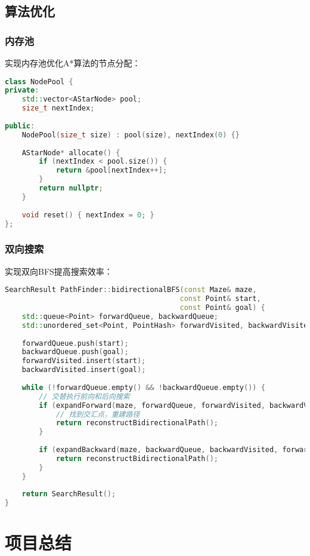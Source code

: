 \documentclass[UTF8]{ctexart}
\begin{document}
\subsection{算法优化}

\subsubsection{内存池}
实现内存池优化A*算法的节点分配：
\begin{lstlisting}[language=C++]
class NodePool {
private:
    std::vector<AStarNode> pool;
    size_t nextIndex;
    
public:
    NodePool(size_t size) : pool(size), nextIndex(0) {}
    
    AStarNode* allocate() {
        if (nextIndex < pool.size()) {
            return &pool[nextIndex++];
        }
        return nullptr;
    }
    
    void reset() { nextIndex = 0; }
};
\end{lstlisting}

\subsubsection{双向搜索}
实现双向BFS提高搜索效率：
\begin{lstlisting}[language=C++]
SearchResult PathFinder::bidirectionalBFS(const Maze& maze, 
                                         const Point& start, 
                                         const Point& goal) {
    std::queue<Point> forwardQueue, backwardQueue;
    std::unordered_set<Point, PointHash> forwardVisited, backwardVisited;
    
    forwardQueue.push(start);
    backwardQueue.push(goal);
    forwardVisited.insert(start);
    backwardVisited.insert(goal);
    
    while (!forwardQueue.empty() && !backwardQueue.empty()) {
        // 交替执行前向和后向搜索
        if (expandForward(maze, forwardQueue, forwardVisited, backwardVisited)) {
            // 找到交汇点，重建路径
            return reconstructBidirectionalPath();
        }
        
        if (expandBackward(maze, backwardQueue, backwardVisited, forwardVisited)) {
            return reconstructBidirectionalPath();
        }
    }
    
    return SearchResult();
}
\end{lstlisting}

\section{项目总结}
\end{document}
